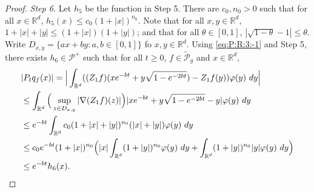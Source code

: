 \documentclass[a4paper,12pt, reqno]{amsart}
\numberwithin{equation}{section}
\begin{document}
\begin{proof}
	\emph{Step 6.}
	Let $h_5$ be the function in Step 5.
	There are $c_0, n_0> 0$ such that for all $x\in \mathbb R^d$, $h_5(x) \leq c_0(1+|x|)^{n_0}$.
	Note that for all $x, y \in \mathbb R^d$, $1+|x|+|y|\leq (1+|x|) (1+|y|)$; and that for all $\theta \in [0,1]$, $|\sqrt {1 - \theta} - 1| \leq \theta$.
	Write $D_{x,y} = \{ax+by: a, b \in [0,1]\}$ fo $x, y \in \mathbb R^d$.
	Using \eqref{eq:P:R:3:-1} and Step 5, there exists  $h_6 \in \mathcal P^+$ such that for all $t \geq 0$, $f \in \widetilde {\mathcal P}_g$ and $x \in \mathbb R^d$,
	\begin{align}
	& |P_t q_f(x)|
	= \Big| \int_{\mathbb R^d} ( (Z_1f)(x e^{-bt}+ y \sqrt{1 - e^{-2bt}}) - Z_1 f (y) ) \varphi(y) ~dy \Big| \\
	& \leq \int_{\mathbb R^d} \Big(\sup_{z\in D_{x,y}} |\nabla  (Z_1f) (z) |\Big) | x e^{-bt} + y \sqrt{1 - e^{-2bt}} - y | \varphi(y) ~dy \\
	& \leq e^{-bt} \int_{\mathbb R^d} c_0(1+|x|+|y|)^{n_0} (|x|+|y|) \varphi(y) ~dy \\
	& \leq c_0 e^{-bt}(1+|x|)^{n_0}\Big(|x|\int_{\mathbb R^d} (1+|y|)^{n_0}\varphi(y) ~dy + \int_{\mathbb R^d} (1+ |y|)^{n_0} |y| \varphi(y) ~dy \Big) \\
	& \leq e^{-bt} h_6(x).
	\qedhere
	\end{align}
\end{proof}


\end{document}
